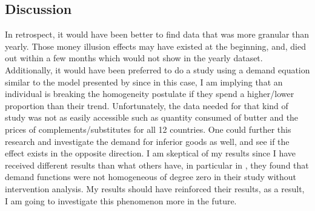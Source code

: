 \documentclass{paper}
\begin{document}
\subsection{Discussion} 
In retrospect, it would have been better to find data that was more granular than yearly. Those money illusion effects may have existed at the beginning, and, died out within a few months which would not show in the yearly dataset. Additionally, it would have been preferred to do a study using a demand equation similar to the model presented by \cite{deatmuel1980} since in this case, I am implying that an individual is breaking the homogeneity postulate if they spend a higher/lower proportion than their trend. Unfortunately, the data needed for that kind of study was not as easily accessible such as quantity consumed of butter and the prices of complements/substitutes for all 12 countries. One could further this research and investigate the demand for inferior goods as well, and see if the effect exists in the opposite direction. I am skeptical of my results since I have received different results than what others have, in particular in \cite{deatmuel1980}, they found that demand functions were not homogeneous of degree zero in their study without intervention analysis. My results should have reinforced their results, as a result, I am going to investigate this phenomenon more in the future. 



\nocite{kahneman2011}
\end{document}
